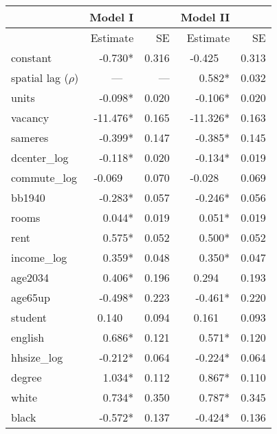 \begin{tabular}{l r r r r}
	\toprule
	                         & \textbf{Model I} &       & \textbf{Model II} &       \\ 
	\midrule
	                         & Estimate         & SE    & Estimate          & SE    \\ 
    \midrule
	constant                 & -0.730*          & 0.316 & -0.425~~          & 0.313 \\
	spatial lag ($\rho$)     & ---~~            & ---   & 0.582*            & 0.032 \\
	units                    & -0.098*          & 0.020 & -0.106*           & 0.020 \\
	vacancy                  & -11.476*         & 0.165 & -11.326*          & 0.163 \\
	sameres                  & -0.399*          & 0.147 & -0.385*           & 0.145 \\
	dcenter\_log             & -0.118*          & 0.020 & -0.134*           & 0.019 \\
	commute\_log             & -0.069~~         & 0.070 & -0.028~~          & 0.069 \\
	bb1940                   & -0.283*          & 0.057 & -0.246*           & 0.056 \\
	rooms                    & 0.044*           & 0.019 & 0.051*            & 0.019 \\
	rent                     & 0.575*           & 0.052 & 0.500*            & 0.052 \\
	income\_log              & 0.359*           & 0.048 & 0.350*            & 0.047 \\
	age2034                  & 0.406*           & 0.196 & 0.294~~           & 0.193 \\
	age65up                  & -0.498*          & 0.223 & -0.461*           & 0.220 \\
	student                  & 0.140~~          & 0.094 & 0.161~~           & 0.093 \\
	english                  & 0.686*           & 0.121 & 0.571*            & 0.120 \\
	hhsize\_log              & -0.212*          & 0.064 & -0.224*           & 0.064 \\
	degree                   & 1.034*           & 0.112 & 0.867*            & 0.110 \\
	white                    & 0.734*           & 0.350 & 0.787*            & 0.345 \\
	black                    & -0.572*          & 0.137 & -0.424*           & 0.136 \\

\end{tabular}
